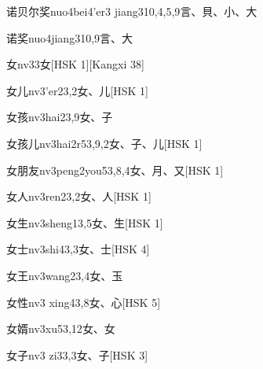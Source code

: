 \begin{entry}{诺贝尔奖}{nuo4bei4'er3 jiang3}{10,4,5,9}{⾔、⾙、⼩、⼤}
\end{entry}

\begin{entry}{诺奖}{nuo4jiang3}{10,9}{⾔、⼤}
\end{entry}

\begin{entry}{女}{nv3}{3}{⼥}[HSK 1][Kangxi 38]
\end{entry}

\begin{entry}{女儿}{nv3'er2}{3,2}{⼥、⼉}[HSK 1]
\end{entry}

\begin{entry}{女孩}{nv3hai2}{3,9}{⼥、⼦}
\end{entry}

\begin{entry}{女孩儿}{nv3hai2r5}{3,9,2}{⼥、⼦、⼉}[HSK 1]
\end{entry}

\begin{entry}{女朋友}{nv3peng2you5}{3,8,4}{⼥、⽉、⼜}[HSK 1]
\end{entry}

\begin{entry}{女人}{nv3ren2}{3,2}{⼥、⼈}[HSK 1]
\end{entry}

\begin{entry}{女生}{nv3sheng1}{3,5}{⼥、⽣}[HSK 1]
\end{entry}

\begin{entry}{女士}{nv3shi4}{3,3}{⼥、⼠}[HSK 4]
\end{entry}

\begin{entry}{女王}{nv3wang2}{3,4}{⼥、⽟}
\end{entry}

\begin{entry}{女性}{nv3 xing4}{3,8}{⼥、⼼}[HSK 5]
\end{entry}

\begin{entry}{女婿}{nv3xu5}{3,12}{⼥、⼥}
\end{entry}

\begin{entry}{女子}{nv3 zi3}{3,3}{⼥、⼦}[HSK 3]
\end{entry}


